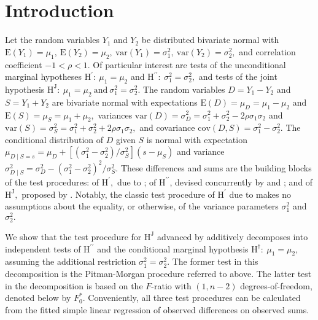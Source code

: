 






\section{Introduction}  
Let the random variables $Y_1$ and $Y_2$ be distributed bivariate normal with $\mathrm{E}(Y_1)=\mu_1,\ \mathrm{E}(Y_2)=\mu_2,\ \mathrm{var}(Y_1)=\sigma^2_1,\ \mathrm{var}(Y_2)=\sigma^2_2,$ and correlation coefficient $-1<\rho<1.$ Of particular interest are tests of the unconditional marginal hypotheses $\textrm{H}^\prime\colon~\mu_1 = \mu_2$ and $\textrm{H}^{\prime\prime}\colon~\sigma^2_1 = \sigma^2_2,$ and tests of the joint hypothesis $\textrm{H}^\mathrm{J}\colon~\mu_1 = \mu_2\ \textrm{and}\ \sigma^2_1 = \sigma^2_2.$ The random variables $D=Y_1-Y_2$ and $S=Y_1+Y_2$ are bivariate normal with expectations $\mathrm{E}(D) = \mu_D = \mu_1- \mu_2$ and $\mathrm{E}(S) = \mu_S = \mu_1+ \mu_2,$ variances $\mathrm{var}(D) = \sigma^2_D = \sigma_1^2 + \sigma_2^2 - 2 \rho \sigma_1 \sigma_2$ and $\mathrm{var}(S) = \sigma^2_S = \sigma_1^2 + \sigma_2^2 + 2 \rho \sigma_1 \sigma_2,$ and covariance $\mathrm{cov}(D,S) = \sigma_1^2 - \sigma_2^2.$ The conditional distribution of $D$ given $S$ is normal with expectation $\mu_{D\mid S=s} = \mu_D + [ ( \sigma^2_1 - \sigma^2_2 ) / \sigma^2_S ] ( s - \mu_S )$ and variance $\sigma^2_{D\mid S} = \sigma^2_D - ( \sigma^2_1 - \sigma^2_2 )^2 / \sigma^2_S.$ These differences and sums are the building blocks of the test procedures: of $\textrm{H}^\prime,$ due to \cite{Student}; of $\textrm{H}^{\prime\prime}$, devised concurrently by \cite{Pit39} and \cite{Morgan39}; and of $\textrm{H}^\mathrm{J},$ proposed by \citet{BradBlack89}. Notably, the classic test procedure of $\textrm{H}^\prime$ due to \cite{Student} makes no assumptions about the equality, or otherwise, of the variance parameters $\sigma^2_1$ and $\sigma^2_2.$


We show that the test procedure for $\textrm{H}^\mathrm{J}$ advanced by \citet{BradBlack89} additively decomposes into independent tests of $\textrm{H}^{\prime\prime}$ and the conditional marginal hypothesis $\textrm{H}^\dag\colon~\mu_1 = \mu_2,$ assuming the additional restriction $\sigma^2_1 = \sigma^2_2.$  The former test in this decomposition is the Pitman-Morgan procedure referred to above. The latter test in the decomposition is based on the $F$-ratio with $(1,n-2)$ degrees-of-freedom, denoted below by $F_0^\ast.$ Conveniently, all three test procedures can be calculated from the fitted simple linear regression of observed differences on observed sums. 



